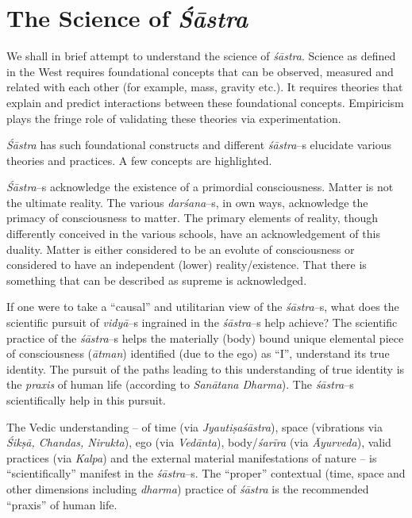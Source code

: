 \section*{The Science of \textit{Śāstra}}

We shall in brief attempt to understand the science of \textit{śāstra}. Science as defined in the West requires foundational concepts that can be observed, measured and related with each other (for example, mass, gravity etc.). It requires theories that explain and predict interactions between these foundational concepts. Empiricism plays the fringe role of validating these theories via experimentation.

\textit{Śāstra} has such foundational constructs and different \textit{śāstra}–s elucidate various theories and practices. A few concepts are highlighted.

\textit{Śāstra}–s acknowledge the existence of a primordial consciousness. Matter is not the ultimate reality. The various \textit{darśana}–s, in own ways, acknowledge the primacy of consciousness to matter. The primary elements of reality, though differently conceived in the various schools, have an acknowledgement of this duality. Matter is either considered to be an evolute of consciousness or considered to have an independent (lower) reality/existence. That there is something that can be described as supreme is acknowledged.

If one were to take a “causal” and utilitarian view of the \textit{śāstra}–s, what does the scientific pursuit of \textit{vidyā}–s ingrained in the \textit{śāstra}–s help achieve? The scientific practice of the \textit{śāstra}–s helps the materially (body) bound unique elemental piece of consciousness (\textit{ātman}) identified (due to the ego) as “I”, understand its true identity. The pursuit of the paths leading to this understanding of true identity is the \textit{praxis} of human life (according to \textit{Sanātana Dharma}). The \textit{śāstra}–s scientifically help in this pursuit. 

The Vedic understanding – of time (via \textit{Jyautiṣaśāstra}), space (vibrations via \textit{Śikṣā, Chandas, Nirukta}), ego (via \textit{Vedānta}), body/\textit{śarīra} (via \textit{Āyurveda}), valid practices (via \textit{Kalpa}) and the external material manifestations of nature – is “scientifically” manifest in the \textit{śāstra}–s. The “proper” contextual (time, space and other dimensions including \textit{dharma}) practice of \textit{śāstra} is the recommended “praxis” of human life.


